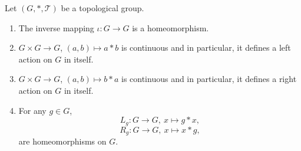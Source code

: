 \begin{propositionenv}
    Let $(G,*,\mathscr{T})$ be a topological group.
    \begin{enumerate}
        \item The inverse mapping $\iota : G\rightarrow G$ is a homeomorphism.
        \item $G \times G \rightarrow G$, $(a,b) \mapsto a*b$ is continuous and in particular, it defines a left action on $G$ in itself.
        \item $G \times G \rightarrow G$, $(a,b) \mapsto b*a$ is continuous and in particular, it defines a right action on $G$ in itself.
        \item For any $g \in G$,
            $$ L_g : G \rightarrow G, \ x \mapsto g*x,$$
            $$ R_g : G \rightarrow G, \ x \mapsto x*g,$$
            are homeomorphisms on $G$.
    \end{enumerate}
\end{propositionenv}
